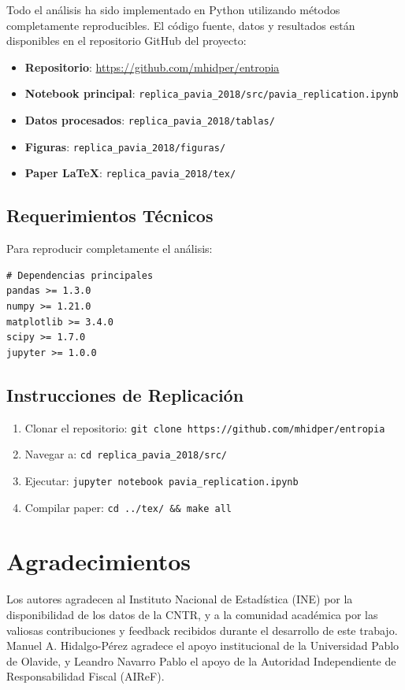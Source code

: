 \documentclass{article}
\begin{document}
Todo el análisis ha sido implementado en Python utilizando métodos completamente reproducibles. El código fuente, datos y resultados están disponibles en el repositorio GitHub del proyecto:

\begin{itemize}
\item \textbf{Repositorio}: \url{https://github.com/mhidper/entropia}
\item \textbf{Notebook principal}: \texttt{replica\_pavia\_2018/src/pavia\_replication.ipynb}
\item \textbf{Datos procesados}: \texttt{replica\_pavia\_2018/tablas/}
\item \textbf{Figuras}: \texttt{replica\_pavia\_2018/figuras/}
\item \textbf{Paper LaTeX}: \texttt{replica\_pavia\_2018/tex/}
\end{itemize}

\subsection{Requerimientos Técnicos}

Para reproducir completamente el análisis:

\begin{verbatim}
# Dependencias principales
pandas >= 1.3.0
numpy >= 1.21.0
matplotlib >= 3.4.0
scipy >= 1.7.0
jupyter >= 1.0.0
\end{verbatim}

\subsection{Instrucciones de Replicación}

\begin{enumerate}
\item Clonar el repositorio: \texttt{git clone https://github.com/mhidper/entropia}
\item Navegar a: \texttt{cd replica\_pavia\_2018/src/}
\item Ejecutar: \texttt{jupyter notebook pavia\_replication.ipynb}
\item Compilar paper: \texttt{cd ../tex/ \&\& make all}
\end{enumerate}

\section*{Agradecimientos}

Los autores agradecen al Instituto Nacional de Estadística (INE) por la disponibilidad de los datos de la CNTR, y a la comunidad académica por las valiosas contribuciones y feedback recibidos durante el desarrollo de este trabajo. Manuel A. Hidalgo-Pérez agradece el apoyo institucional de la Universidad Pablo de Olavide, y Leandro Navarro Pablo el apoyo de la Autoridad Independiente de Responsabilidad Fiscal (AIReF).


\end{document}
